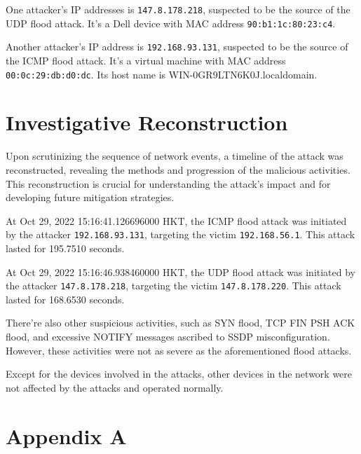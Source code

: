 \documentclass{article}
\begin{document}
    One attacker's IP addresses is \lstinline|147.8.178.218|, suspected to be the source of the UDP flood attack.
    It's a Dell device with MAC address \lstinline|90:b1:1c:80:23:c4|.

    Another attacker's IP address is \lstinline|192.168.93.131|, suspected to be the source of the ICMP flood attack.
    It's a virtual machine with MAC address \lstinline|00:0c:29:db:d0:dc|.
    Its host name is WIN-0GR9LTN6K0J.localdomain.

    
    \section{\fontsize{14pt}{17pt}\selectfont Investigative Reconstruction}\label{sec:selectfont-investigative-reconstruction}
    Upon scrutinizing the sequence of network events, a timeline of the attack was reconstructed,
    revealing the methods and progression of the malicious activities.
    This reconstruction is crucial for understanding the attack's impact and for developing future mitigation strategies.

    At Oct 29, 2022 15:16:41.126696000 HKT, the ICMP flood attack was initiated by the attacker \lstinline|192.168.93.131|,
    targeting the victim \lstinline|192.168.56.1|. This attack lasted for 195.7510 seconds.

    At Oct 29, 2022 15:16:46.938460000 HKT, the UDP flood attack was initiated by the attacker \lstinline|147.8.178.218|,
    targeting the victim \lstinline|147.8.178.220|. This attack lasted for 168.6530 seconds.

    There're also other suspicious activities, such as SYN flood, TCP FIN PSH ACK flood, and
    excessive NOTIFY messages ascribed to SSDP misconfiguration.
    However, these activities were not as severe as the aforementioned flood attacks.

    Except for the devices involved in the attacks, other devices in the network were not affected by the attacks and operated normally.


    \section*{\fontsize{14pt}{17pt}\selectfont Appendix A}\label{sec:selectfont-appendix-a}
\end{document}
